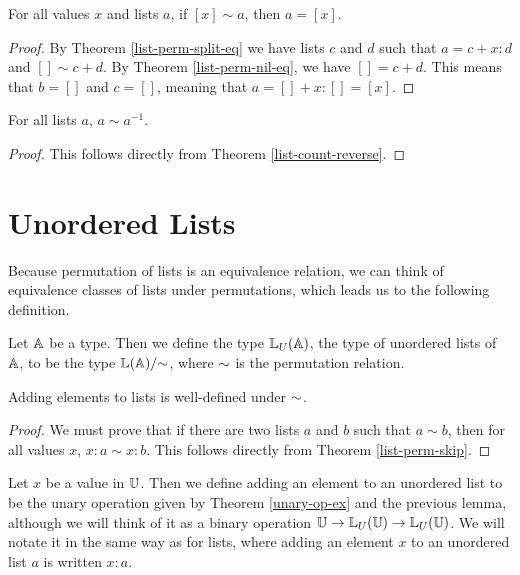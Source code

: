 \documentclass[../math.tex]{subfiles}
\begin{document}
\begin{theorem} \label{list-perm-single}
    For all values $x$ and lists $a$, if $[x] \sim a$, then $a = [x]$.
\end{theorem}
\begin{proof}
    By Theorem \ref{list-perm-split-eq} we have lists $c$ and $d$ such that $a =
    c + x : d$ and $[] \sim c + d$.  By Theorem \ref{list-perm-nil-eq}, we have
    $[] = c + d$.  This means that $b = []$ and $c = []$,  meaning that $a = []
    + x : [] = [x]$.
\end{proof}

\begin{theorem} \label{list-perm-reverse}
    For all lists $a$, $a \sim a^{-1}$.
\end{theorem}
\begin{proof}
    This follows directly from Theorem \ref{list-count-reverse}.
\end{proof}

\section{Unordered Lists}

Because permutation of lists is an equivalence relation, we can think of
equivalence classes of lists under permutations, which leads us to the following
definition.

\begin{definition}
    Let $\mathbb{A}$ be a type.  Then we define the type $\mathbb{L}_U(\mathbb{A})$, the type of
    unordered lists of $\mathbb{A}$, to be the type  $\mathbb{L}(\mathbb{A})/{\sim}$, where ${\sim}$ is
    the permutation relation.
\end{definition}

\begin{lemma}
    Adding elements to lists is well-defined under ${\sim}$.
\end{lemma}
\begin{proof}
    We must prove that if there are two lists $a$ and $b$ such that $a \sim b$,
    then for all values $x$, $x : a \sim x : b$.  This follows directly from
    Theorem \ref{list-perm-skip}.
\end{proof}

\begin{definition}
    Let $x$ be a value in $\mathbb{U}$.  Then we define adding an element to an
    unordered list to be the unary operation given by Theorem \ref{unary-op-ex}
    and the previous lemma, although we will think of it as a binary operation
    $\mathbb{U} \to \mathbb{L}_U(\mathbb{U}) \to \mathbb{L}_U(\mathbb{U})$.  We will notate it in the same way as for
    lists, where adding an element $x$ to an unordered list $a$ is written $x :
    a$.
\end{definition}
\end{document}

